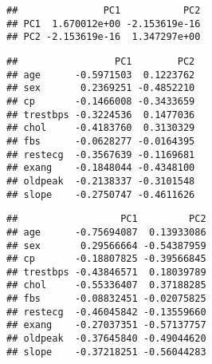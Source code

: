 \documentclass[
]{article}
\newenvironment{Shaded}{\begin{snugshade}}{\end{snugshade}}
\newcommand{\CommentTok}[1]{\textcolor[rgb]{0.56,0.35,0.01}{\textit{#1}}}
\newcommand{\DecValTok}[1]{\textcolor[rgb]{0.00,0.00,0.81}{#1}}
\newcommand{\FunctionTok}[1]{\textcolor[rgb]{0.00,0.00,0.00}{#1}}
\newcommand{\NormalTok}[1]{#1}
\newcommand{\OtherTok}[1]{\textcolor[rgb]{0.56,0.35,0.01}{#1}}
\newcommand{\SpecialCharTok}[1]{\textcolor[rgb]{0.00,0.00,0.00}{#1}}
\begin{document}
\begin{verbatim}
##               PC1           PC2
## PC1  1.670012e+00 -2.153619e-16
## PC2 -2.153619e-16  1.347297e+00
\end{verbatim}

\begin{Shaded}
\end{Shaded}

\begin{verbatim}
##                 PC1        PC2
## age      -0.5971503  0.1223762
## sex       0.2369251 -0.4852210
## cp       -0.1466008 -0.3433659
## trestbps -0.3224536  0.1477036
## chol     -0.4183760  0.3130329
## fbs      -0.0628277 -0.0164395
## restecg  -0.3567639 -0.1169681
## exang    -0.1848044 -0.4348100
## oldpeak  -0.2138337 -0.3101548
## slope    -0.2750747 -0.4611626
\end{verbatim}

\begin{Shaded}
\end{Shaded}

\begin{verbatim}
##                  PC1         PC2
## age      -0.75694087  0.13933086
## sex       0.29566664 -0.54387959
## cp       -0.18807825 -0.39566845
## trestbps -0.43846571  0.18039789
## chol     -0.55336407  0.37188285
## fbs      -0.08832451 -0.02075825
## restecg  -0.46045842 -0.13559660
## exang    -0.27037351 -0.57137757
## oldpeak  -0.37645840 -0.49044620
## slope    -0.37218251 -0.56044283
\end{verbatim}

\begin{Shaded}
\end{Shaded}
\end{document}
